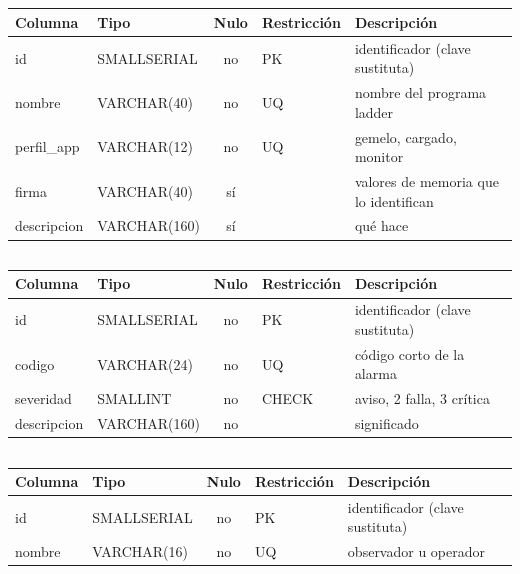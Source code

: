 \subsection*{}
\begin{longtable}{>{\ttfamily\raggedright}p{2.6cm} >{\ttfamily\raggedright}p{2.5cm} c >{\raggedright\footnotesize}p{3.6cm} >{\raggedright\arraybackslash}p{4.5cm}}
\toprule \textrm{\textbf{Columna}} & \textrm{\textbf{Tipo}} & \textbf{Nulo} & \textbf{Restricción} & \textbf{Descripción}\\ \midrule
id & SMALLSERIAL & no & PK & identificador (clave sustituta)\\
nombre & VARCHAR(40) & no & UQ & nombre del programa ladder\\
perfil\_app & VARCHAR(12) & no & UQ & gemelo, cargado, monitor\\
firma & VARCHAR(40) & sí &  & valores de memoria que lo identifican\\
descripcion & VARCHAR(160) & sí &  & qué hace\\
\bottomrule \end{longtable}
\subsection*{}
\begin{longtable}{>{\ttfamily\raggedright}p{2.6cm} >{\ttfamily\raggedright}p{2.5cm} c >{\raggedright\footnotesize}p{3.6cm} >{\raggedright\arraybackslash}p{4.5cm}}
\toprule \textrm{\textbf{Columna}} & \textrm{\textbf{Tipo}} & \textbf{Nulo} & \textbf{Restricción} & \textbf{Descripción}\\ \midrule
id & SMALLSERIAL & no & PK & identificador (clave sustituta)\\
codigo & VARCHAR(24) & no & UQ & código corto de la alarma\\
severidad & SMALLINT & no & CHECK & 1 aviso, 2 falla, 3 crítica\\
descripcion & VARCHAR(160) & no &  & significado\\
\bottomrule \end{longtable}
\subsection*{}
\begin{longtable}{>{\ttfamily\raggedright}p{2.6cm} >{\ttfamily\raggedright}p{2.5cm} c >{\raggedright\footnotesize}p{3.6cm} >{\raggedright\arraybackslash}p{4.5cm}}
\toprule \textrm{\textbf{Columna}} & \textrm{\textbf{Tipo}} & \textbf{Nulo} & \textbf{Restricción} & \textbf{Descripción}\\ \midrule
id & SMALLSERIAL & no & PK & identificador (clave sustituta)\\
nombre & VARCHAR(16) & no & UQ & observador u operador\\
\bottomrule \end{longtable}
